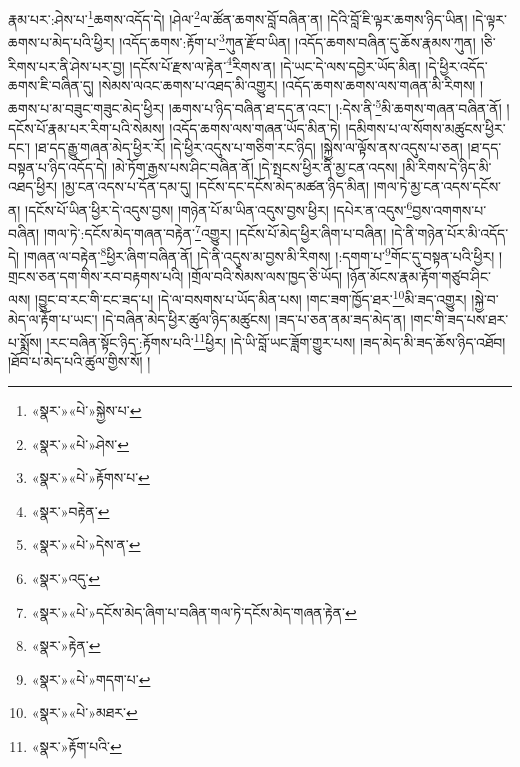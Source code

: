 རྣམ་པར་:ཤེས་པ་\footnote{«སྣར་»«པེ་»སྐྱེས་པ་}ཆགས་འདོད་དེ། །ཤེལ་\footnote{«སྣར་»«པེ་»ཤེས་}ལ་ཚོན་ཆགས་བློ་བཞིན་ན། །དེའི་བློ་ཇི་ལྟར་ཆགས་ཉིད་ཡིན། །དེ་ལྟར་ཆགས་པ་མེད་པའི་ཕྱིར། །འདོད་ཆགས་:རྟོག་པ་\footnote{«སྣར་»«པེ་»རྟོགས་པ་}ཀུན་རྫོབ་ཡིན། །འདོད་ཆགས་བཞིན་དུ་ཆོས་རྣམས་ཀུན། །ཅི་རིགས་པར་ནི་ཤེས་པར་བྱ། །དངོས་པོ་རྫས་ལ་རྟེན་\footnote{«སྣར་»བརྟེན་}རིགས་ན། །དེ་ཡང་དེ་ལས་དབྱེར་ཡོད་མིན། །དེ་ཕྱིར་འདོད་ཆགས་ཇི་བཞིན་དུ། །སེམས་ལའང་ཆགས་པ་འཐད་མི་འགྱུར། །འདོད་ཆགས་ཆགས་ལས་གཞན་མི་རིགས། །ཆགས་པ་མ་བཟུང་གཟུང་མེད་ཕྱིར། །ཆགས་པ་ཉིད་བཞིན་ཐ་དད་ན་འང་། །:དེས་ནི་\footnote{«སྣར་»«པེ་»དེས་ན་}མི་ཆགས་གཞན་བཞིན་ནོ། །དངོས་པོ་རྣམ་པར་རིག་པའི་སེམས། །འདོད་ཆགས་ལས་གཞན་ཡོད་མིན་ཏེ། །དམིགས་པ་ལ་སོགས་མཚུངས་ཕྱིར་དང་། །ཐ་དད་རྒྱུ་གཞན་མེད་ཕྱིར་རོ། །དེ་ཕྱིར་འདུས་པ་གཅིག་རང་ཉིད། །སྐྱེས་ལ་ལྟོས་ནས་འདུས་པ་ཅན། །ཐ་དད་བསྟན་པ་ཉིད་འདོད་དེ། །མེ་ཏོག་རྒྱས་པས་ཤིང་བཞིན་ནོ། །དེ་སྤངས་ཕྱིར་ནི་མྱ་ངན་འདས། །མི་རིགས་དེ་ཉིད་མི་འཐད་ཕྱིར། །མྱ་ངན་འདས་པ་དོན་དམ་དུ། །དངོས་དང་དངོས་མེད་མཚན་ཉིད་མིན། །གལ་ཏེ་མྱ་ངན་འདས་དངོས་ན། །དངོས་པོ་ཡིན་ཕྱིར་དེ་འདུས་བྱས། །གཉེན་པོ་མ་ཡིན་འདུས་བྱས་ཕྱིར། །དཔེར་ན་འདུས་\footnote{«སྣར་»འདུ་}བྱས་འགགས་པ་བཞིན། །གལ་ཏེ་:དངོས་མེད་གཞན་བརྟེན་\footnote{«སྣར་»«པེ་»དངོས་མེད་ཞིག་པ་བཞིན་གལ་ཏེ་དངོས་མེད་གཞན་རྟེན་}འགྱུར། །དངོས་པོ་མེད་ཕྱིར་ཞིག་པ་བཞིན། །དེ་ནི་གཉེན་པོར་མི་འདོད་དེ། །གཞན་ལ་བརྟེན་\footnote{«སྣར་»རྟེན་}ཕྱིར་ཞིག་བཞིན་ནོ། །དེ་ནི་འདུས་མ་བྱས་མི་རིགས། །:དགག་པ་\footnote{«སྣར་»«པེ་»གདག་པ་}གོང་དུ་བསྟན་པའི་ཕྱིར། །གྲངས་ཅན་དག་གིས་རབ་བརྟགས་པའི། །གྲོལ་བའི་སེམས་ལས་ཁྱད་ཅི་ཡོད། །ཉོན་མོངས་རྣམ་རྟོག་གཙུབ་ཤིང་ལས། །བྱུང་བ་རང་གི་ངང་ཟད་པ། །དེ་ལ་བསགས་པ་ཡོད་མིན་པས། །གང་ཟག་ཁྱོད་ཐར་\footnote{«སྣར་»«པེ་»མཐར་}མི་ཟད་འགྱུར། །སྐྱེ་བ་མེད་ལ་རྟོག་པ་ཡང་། །དེ་བཞིན་མེད་ཕྱིར་ཚུལ་ཉིད་མཚུངས། །ཟད་པ་ཅན་ནམ་ཟད་མེད་ན། །གང་གི་ཟད་པས་ཐར་པ་སྨྲོས། །རང་བཞིན་སྟོང་ཉིད་:རྟོགས་པའི་\footnote{«སྣར་»རྟོག་པའི་}ཕྱིར། །དེ་ཡི་བློ་ཡང་ཟློག་གྱུར་པས། །ཟད་མེད་མི་ཟད་ཆོས་ཉིད་འཐོབ། །ཐོབ་པ་མེད་པའི་ཚུལ་གྱིས་སོ། །
